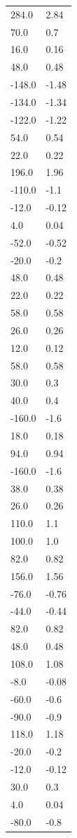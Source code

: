 \begin{longtable}{ll}
284.0 & 2.84 \\
70.0 & 0.7 \\
16.0 & 0.16 \\
48.0 & 0.48 \\
-148.0 & -1.48 \\
-134.0 & -1.34 \\
-122.0 & -1.22 \\
54.0 & 0.54 \\
22.0 & 0.22 \\
196.0 & 1.96 \\
-110.0 & -1.1 \\
-12.0 & -0.12 \\
4.0 & 0.04 \\
-52.0 & -0.52 \\
-20.0 & -0.2 \\
48.0 & 0.48 \\
22.0 & 0.22 \\
58.0 & 0.58 \\
26.0 & 0.26 \\
12.0 & 0.12 \\
58.0 & 0.58 \\
30.0 & 0.3 \\
40.0 & 0.4 \\
-160.0 & -1.6 \\
18.0 & 0.18 \\
94.0 & 0.94 \\
-160.0 & -1.6 \\
38.0 & 0.38 \\
26.0 & 0.26 \\
110.0 & 1.1 \\
100.0 & 1.0 \\
82.0 & 0.82 \\
156.0 & 1.56 \\
-76.0 & -0.76 \\
-44.0 & -0.44 \\
82.0 & 0.82 \\
48.0 & 0.48 \\
108.0 & 1.08 \\
-8.0 & -0.08 \\
-60.0 & -0.6 \\
-90.0 & -0.9 \\
118.0 & 1.18 \\
-20.0 & -0.2 \\
-12.0 & -0.12 \\
30.0 & 0.3 \\
4.0 & 0.04 \\
-80.0 & -0.8 \\

\end{longtable}
